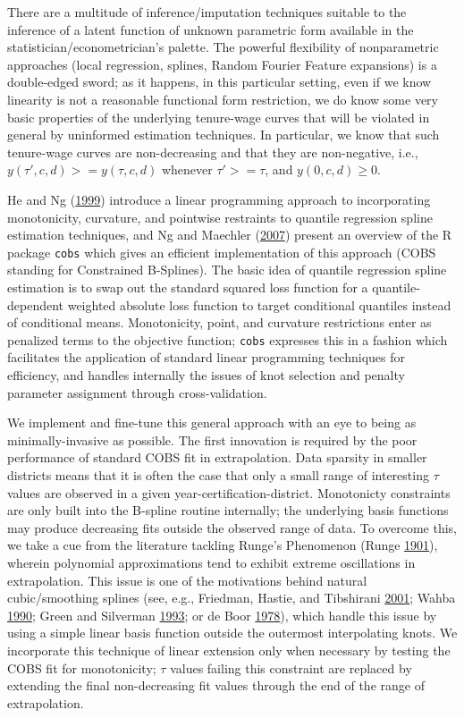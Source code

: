 \documentclass[12pt,]{article}
\begin{document}
There are a multitude of inference/imputation techniques suitable to the
inference of a latent function of unknown parametric form available in
the statistician/econometrician's palette. The powerful flexibility of
nonparametric approaches (local regression, splines, Random Fourier
Feature expansions) is a double-edged sword; as it happens, in this
particular setting, even if we know linearity is not a reasonable
functional form restriction, we do know some very basic properties of
the underlying tenure-wage curves that will be violated in general by
uninformed estimation techniques. In particular, we know that such
tenure-wage curves are non-decreasing and that they are non-negative,
i.e., \(y(\tau', c, d) >= y(\tau, c, d)\) whenever \(\tau' >= \tau\),
and \(y(0, c, d) \geq 0\).

He and Ng (\protect\hyperlink{ref-he}{1999}) introduce a linear
programming approach to incorporating monotonicity, curvature, and
pointwise restraints to quantile regression spline estimation
techniques, and Ng and Maechler (\protect\hyperlink{ref-ng}{2007})
present an overview of the R package \texttt{cobs} which gives an
efficient implementation of this approach (COBS standing for Constrained
B-Splines). The basic idea of quantile regression spline estimation is
to swap out the standard squared loss function for a quantile-dependent
weighted absolute loss function to target conditional quantiles instead
of conditional means. Monotonicity, point, and curvature restrictions
enter as penalized terms to the objective function; \texttt{cobs}
expresses this in a fashion which facilitates the application of
standard linear programming techniques for efficiency, and handles
internally the issues of knot selection and penalty parameter assignment
through cross-validation.

We implement and fine-tune this general approach with an eye to being as
minimally-invasive as possible. The first innovation is required by the
poor performance of standard COBS fit in extrapolation. Data sparsity in
smaller districts means that it is often the case that only a small
range of interesting \(\tau\) values are observed in a given
year-certification-district. Monotonicty constraints are only built into
the B-spline routine internally; the underlying basis functions may
produce decreasing fits outside the observed range of data. To overcome
this, we take a cue from the literature tackling Runge's Phenomenon
(Runge \protect\hyperlink{ref-runge}{1901}), wherein polynomial
approximations tend to exhibit extreme oscillations in extrapolation.
This issue is one of the motivations behind natural cubic/smoothing
splines (see, e.g., Friedman, Hastie, and Tibshirani
\protect\hyperlink{ref-friedman}{2001}; Wahba
\protect\hyperlink{ref-wahba}{1990}; Green and Silverman
\protect\hyperlink{ref-green}{1993}; or de Boor
\protect\hyperlink{ref-deboor}{1978}), which handle this issue by using
a simple linear basis function outside the outermost interpolating
knots. We incorporate this technique of linear extension only when
necessary by testing the COBS fit for monotonicity; \(\tau\) values
failing this constraint are replaced by extending the final
non-decreasing fit values through the end of the range of extrapolation.
\end{document}
